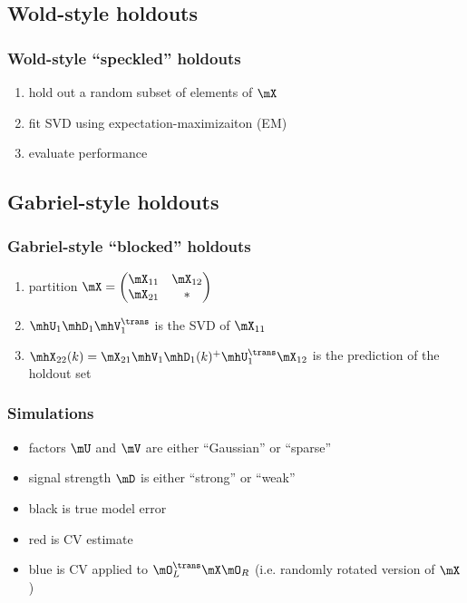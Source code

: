 \documentclass{beamer}
\begin{document}
\subsection{Wold-style holdouts}

\begin{frame}
  \frametitle{Wold-style ``speckled'' holdouts}
  \begin{enumerate}
    \item hold out a random subset of elements of $\mX$
    \item fit SVD using expectation-maximizaiton (EM)
    \item evaluate performance
  \end{enumerate}
\end{frame}

\subsection{Gabriel-style holdouts}

\begin{frame}
  \frametitle{Gabriel-style ``blocked'' holdouts}
  \begin{enumerate}
    \item partition
    \(
      \mX = \left(\begin{matrix} \mX_{11} & \mX_{12} \\ \mX_{21} & \ast \end{matrix}\right)
    \)
    \item $\mhU_1 \mhD_1 \mhV_1^\trans$ is the SVD of $\mX_{11}$
    \item $\mhX_{22}(k) = \mX_{21} \mhV_1 \mhD_1(k)^+ \mhU_1^\trans \mX_{12}$ is the prediction of the holdout set
  \end{enumerate}
\end{frame}

\begin{frame}
  \frametitle{Simulations}
  \begin{itemize}
    \item factors $\mU$ and $\mV$ are either ``Gaussian'' or ``sparse''
    \item signal strength $\mD$ is either ``strong'' or ``weak''
    \item black is true model error
    \item red is CV estimate
    \item blue is CV applied to $\mO_L^\trans \mX \mO_R$ (i.e. randomly rotated version of $\mX$) 
  \end{itemize}
\end{frame}
\end{document}
